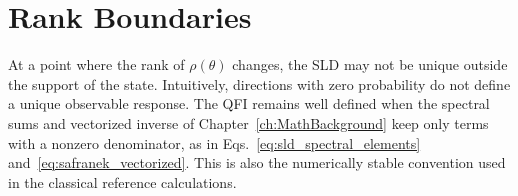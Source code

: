 \section{Rank Boundaries}

\begin{remark}
    At a point where the rank of $\rho(\theta)$ changes, the SLD may not be unique outside the support of the state.  Intuitively, directions with zero probability do not define a unique observable response.  The QFI remains well defined when the spectral sums and vectorized inverse of Chapter~\ref{ch:MathBackground} keep only terms with a nonzero denominator, as in Eqs.~\eqref{eq:sld_spectral_elements} and~\eqref{eq:safranek_vectorized}.  This is also the numerically stable convention used in the classical reference calculations.
\end{remark}
